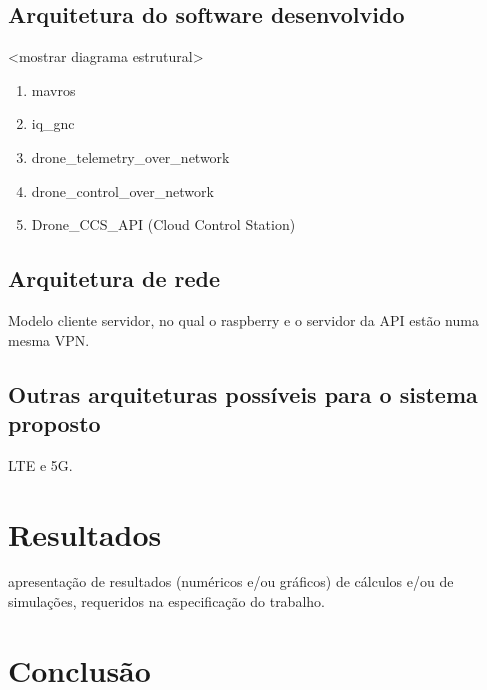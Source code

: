 \documentclass[12pt,a4paper,oneside]{book}
\begin{document}
\section{Arquitetura do software desenvolvido}

<mostrar diagrama estrutural>

\begin{enumerate}
  \item mavros 
  \item iq\_gnc
  \item drone\_telemetry\_over\_network
  \item drone\_control\_over\_network
  \item Drone\_CCS\_API (Cloud Control Station)
\end{enumerate}

\section{Arquitetura de rede}

Modelo cliente servidor, no qual o raspberry e o servidor da API estão numa mesma VPN. 

\section{Outras arquiteturas possíveis para o sistema proposto}

LTE e 5G.


\chapter{Resultados}
%
\thispagestyle{empty} 
%
apresentação de resultados (numéricos e/ou gráficos) 
de cálculos e/ou de simulações, requeridos na especificação do trabalho.




\chapter{Conclusão}
%
\thispagestyle{empty} 
%
\end{document}
